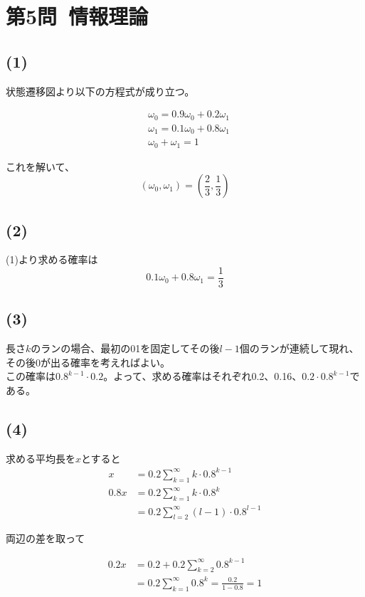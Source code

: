 \documentclass[a4paper,12pt,xelatex,ja=standard]{bxjsarticle}
\begin{document}
\section*{第5問\ 情報理論}
\subsection*{(1)}
状態遷移図より以下の方程式が成り立つ。

\begin{equation*}
  \begin{split}
    &\omega_0 = 0.9 \omega_0 + 0.2 \omega_1 \\
    &\omega_1 = 0.1 \omega_0 + 0.8 \omega_1 \\
    &\omega_0 + \omega_1 = 1
  \end{split}
\end{equation*}

これを解いて、
\[
  (\omega_0, \omega_1) = (\frac{2}{3}, \frac{1}{3})
\]

\subsection*{(2)}
(1)より求める確率は
\[
  0.1 \omega_0 + 0.8 \omega_1 = \frac{1}{3}
\]

\subsection*{(3)}
長さ$k$のランの場合、最初の01を固定してその後$l-1$個のランが連続して現れ、その後0が出る確率を考えればよい。\\
この確率は$0.8^{k-1} \cdot 0.2$。よって、求める確率はそれぞれ0.2、0.16、$0.2 \cdot 0.8^{k-1}$である。

\subsection*{(4)}
求める平均長を$x$とすると
\begin{equation*}
  \begin{split}
    x &= 0.2 \sum^{\infty}_{k=1}k \cdot 0.8^{k-1}\\
    0.8x &= 0.2 \sum^{\infty}_{k=1}k \cdot 0.8^{k} \\
      &= 0.2 \sum^{\infty}_{l=2}(l-1) \cdot 0.8^{l-1}
  \end{split}
\end{equation*}

両辺の差を取って

\begin{equation*}
  \begin{split}
    0.2x &= 0.2 + 0.2 \sum^{\infty}_{k=2} 0.8^{k-1}\\
      &= 0.2 \sum^{\infty}_{k=1} 0.8^{k} = \frac{0.2}{1 - 0.8} = 1
  \end{split}
\end{equation*}
\end{document}
